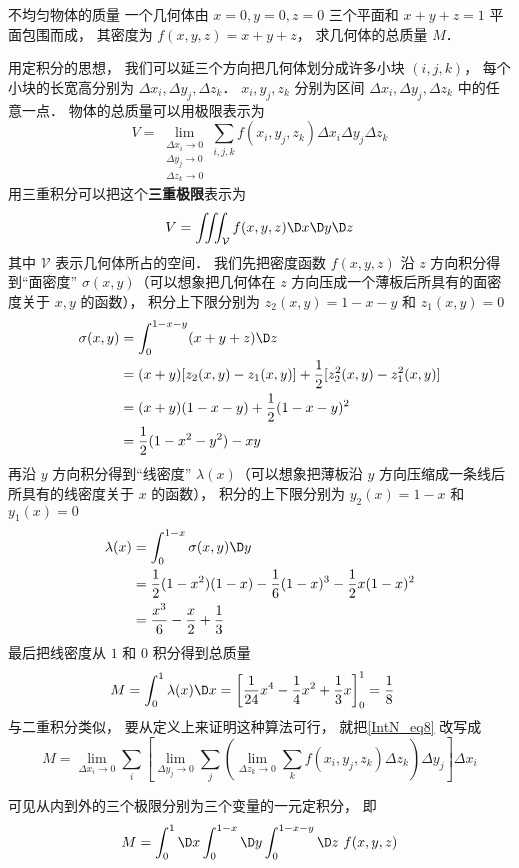 \begin{exam}{不均匀物体的质量}
一个几何体由 $x = 0, y = 0, z = 0$ 三个平面和 $x + y + z = 1$ 平面包围而成， 其密度为 $f(x,y,z) = x + y + z$， 求几何体的总质量 $M$．

用定积分的思想， 我们可以延三个方向把几何体划分成许多小块 $(i,j,k)$， 每个小块的长宽高分别为 $\Delta x_i, \Delta y_j, \Delta z_k$． $x_i, y_j, z_k$ 分别为区间 $\Delta x_i, \Delta y_j, \Delta z_k$ 中的任意一点． 物体的总质量可以用极限表示为
\begin{equation}\label{IntN_eq8}
V = \lim_{\substack{\Delta x_i\to 0\\ \Delta y_j\to 0\\ \Delta z_k\to 0}} \sum_{i, j, k} f(x_i,y_j,z_k) \Delta x_i \Delta y_j \Delta z_k
\end{equation}
用三重积分可以把这个\textbf{三重极限}表示为
\begin{equation}
V = \iiint_{\mathcal{V}} f(x,y,z) \D x\D y \D z
\end{equation}
其中 $\mathcal{V}$ 表示几何体所占的空间． 我们先把密度函数 $f(x,y,z)$ 沿 $z$ 方向积分得到“面密度” $\sigma(x,y)$（可以想象把几何体在 $z$ 方向压成一个薄板后所具有的面密度关于 $x,y$ 的函数）， 积分上下限分别为 $z_2(x,y) = 1 -x - y$ 和 $z_1(x,y) = 0$
\begin{equation}\begin{aligned}
\sigma(x,y) &= \int_{0}^{1-x-y} (x+y+z) \D z \\
&= (x + y)[z_2(x,y) - z_1(x,y)] + \frac 12 [z_2^2(x,y) - z_1^2(x,y)]\\
&= (x + y)(1-x-y) + \frac 12 (1-x-y)^2\\
&= \frac 12 (1 - x^2 - y^2) - xy
\end{aligned}\end{equation}
再沿 $y$ 方向积分得到“线密度” $\lambda(x)$（可以想象把薄板沿 $y$ 方向压缩成一条线后所具有的线密度关于 $x$ 的函数）， 积分的上下限分别为 $y_2(x) = 1-x$ 和 $y_1(x) = 0$
\begin{equation}\begin{aligned}
\lambda(x) &= \int_{0}^{1-x} \sigma(x,y) \D y \\
&= \frac 12 (1-x^2) (1-x) - \frac 16 (1-x)^3 - \frac 12 x(1-x)^2\\
&= \frac{x^3}{6} - \frac{x}{2} + \frac 13
\end{aligned}\end{equation}
最后把线密度从 $1$ 和 $0$ 积分得到总质量
\begin{equation}\begin{aligned}
M &= \int_{0}^{1} \lambda(x) \D x = \left[\frac{1}{24} x^4 - \frac 14 x^2 + \frac 13 x\right]_0^1 = \frac 18
\end{aligned}\end{equation}
与二重积分类似， 要从定义上来证明这种算法可行， 就把\autoref{IntN_eq8} 改写成
\begin{equation}
M = \lim_{\Delta x_i\to 0} \sum_{i} \left[\lim_{\Delta y_j\to 0}\sum_{j} \left( \lim_{\Delta z_k\to 0} \sum_{k} f(x_i,y_j,z_k) \Delta z_k\right)\Delta y_j \right] \Delta x_i
\end{equation}
\end{exam}
可见从内到外的三个极限分别为三个变量的一元定积分， 即
\begin{equation}
M = \int_{0}^{1} \D x \int_{0}^{1-x} \D y  \int_{0}^{1-x-y} \D z\,\, f(x,y,z)
\end{equation}

